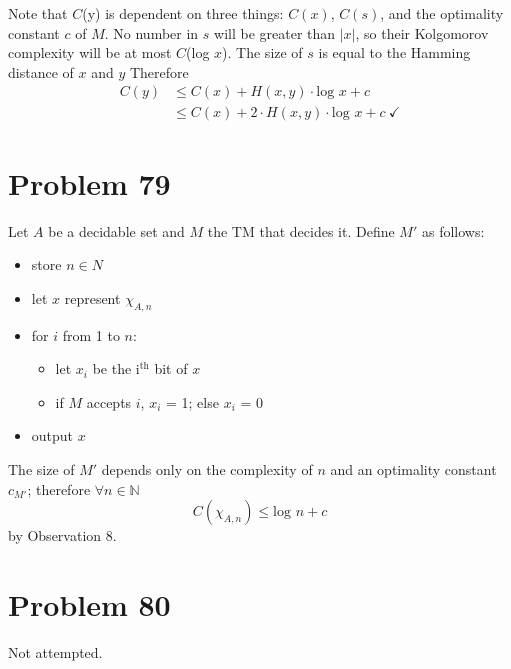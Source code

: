 \documentclass[11pt]{article}
\begin{document}
Note that $C$(y) is dependent on three things: $C(x)$, $C(s)$, and the optimality constant $c$ of $M$.
No number in $s$ will be greater than $|x|$, so their Kolgomorov complexity will be at most $C$(log $x$).
The size of $s$ is equal to the Hamming distance of $x$ and $y$
Therefore
\begin{align*}
	C(y) & \leq C(x) + H(x, y) \cdot \text{log } x  + c \\
	&\leq C(x) + 2 \cdot H(x, y) \cdot \text{log } x  + c\ \checkmark
\end{align*}


\section*{Problem 79}

Let $A$ be a decidable set and $M$ the TM that decides it.
Define $M'$ as follows:

\begin{itemize}
	\item store $n \in N$
	\item let $x$ represent $\chi_{A,n}$
	\item for $i$ from 1 to $n$:
	\begin{itemize}
		\item let $x_i$ be the i$^{\text{th}}$ bit of $x$
		\item if $M$ accepts $i$, $x_i$ = 1; else $x_i$ = 0
	\end{itemize}
	\item output $x$
\end{itemize}

The size of $M'$ depends only on the complexity of $n$ and an optimality constant $c_{M'}$; therefore $\forall n \in \mathbb{N}$
	\[C(\chi_{A,n}) \leq \text{log }n +c\]
by Observation 8. 


\section*{Problem 80}

Not attempted.
\end{document}
